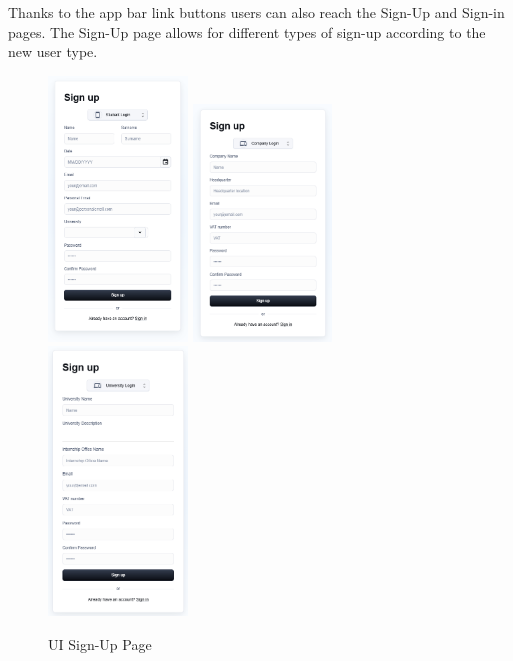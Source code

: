 \noindent Thanks to the app bar link buttons users can also reach the Sign-Up and Sign-in pages. The Sign-Up page allows for different types of sign-up according to the new user type.
\begin{figure}[H]
    \includegraphics[width=0.33\textwidth]{Latex/Images/StudentSignUp.png}
    \includegraphics[width=0.33\textwidth]{Latex/Images/CompanySignUp.png}
    \includegraphics[width=0.33\textwidth]{Latex/Images/UniversitySignUp.png}
    \caption{UI Sign-Up Page}
    \label{fig:signuppage}
\end{figure}
